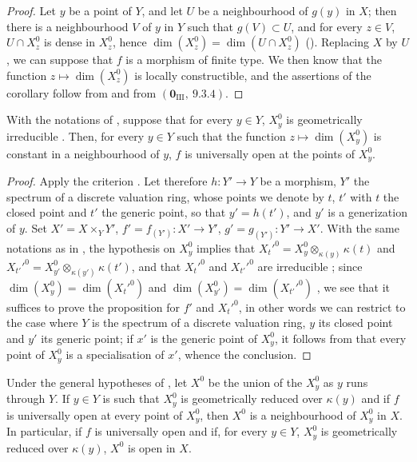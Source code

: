\begin{proof}
Let $y$ be a point of $Y$, and let $U$ be a neighbourhood of $g(y)$ in $X$; then there is a neighbourhood $V$ of $y$ in $Y$ such that $g(V)\subset U$, and for every $z\in V$, $U\cap X_z^0$ is dense in $X_z^0$, hence $\dim(X_z^0)=\dim(U\cap X_z^0)$ ().
Replacing $X$ by $U$, we can suppose that $f$ is a morphism of finite type.
We then know  that the function $z\mapsto\dim(X_z^0)$ is locally constructible, and the assertions of the corollary follow from  and from $(\mathbf{0}_{\mathrm{III}},~9.3.4)$.
\end{proof}

\begin{proposition}[15.6.3]
\label{IV.15.6.3}
With the notations of , suppose that for every $y\in Y$, $X_y^0$ is geometrically irreducible .
Then, for every $y\in Y$ such that the function $z\mapsto\dim(X_y^0)$ is constant in a neighbourhood of $y$, $f$ is universally open at the points of $X_y^0$.
\end{proposition}

\begin{proof}
Apply the criterion .
Let therefore $h:Y'\to Y$ be a morphism, $Y'$ the spectrum of a discrete valuation ring, whose points we denote by $t$, $t'$ with $t$ the closed point and $t'$ the generic point, so that $y'=h(t')$, and $y'$ is a generization of $y$.
Set $X'=X\times_Y Y'$, $f'=f_{(Y')}:X'\to Y'$, $g'=g_{(Y')}:Y'\to X'$.
With the same notations as in , the hypothesis on $X_y^0$ implies that $X_t'^0=X_y^0\otimes_{\kappa(y)}\kappa(t)$ and $X_{t'}'^0=X_{y'}^0\otimes_{\kappa(y')}\kappa(t')$, and that $X_t'^0$ and $X_{t'}'^0$ are irreducible ; since $\dim(X_y^0)=\dim(X_t'^0)$ and $\dim(X_{y'}^0)=\dim(X_{t'}'^0)$ , we see that it suffices to prove the proposition for $f'$ and $X_t'^0$, in other words we can restrict to the case where $Y$ is the spectrum of a discrete valuation ring, $y$ its closed point and $y'$ its generic point; if $x'$ is the generic point of $X_y^0$, it follows from  that every point of $X_y^0$ is a specialisation of $x'$, whence the conclusion.
\end{proof}

\begin{proposition}[15.6.4]
\label{IV.15.6.4}
Under the general hypotheses of , let $X^0$ be the union of the $X_y^0$ as $y$ runs through $Y$.
If $y\in Y$ is such that $X_y^0$ is geometrically reduced over $\kappa(y)$  and if $f$ is universally open at every point of $X_y^0$, then $X^0$ is a neighbourhood of $X_y^0$ in $X$.
In particular, if $f$ is universally open and if, for every $y\in Y$, $X_y^0$ is geometrically reduced over $\kappa(y)$, $X^0$ is open in $X$.
\end{proposition}

